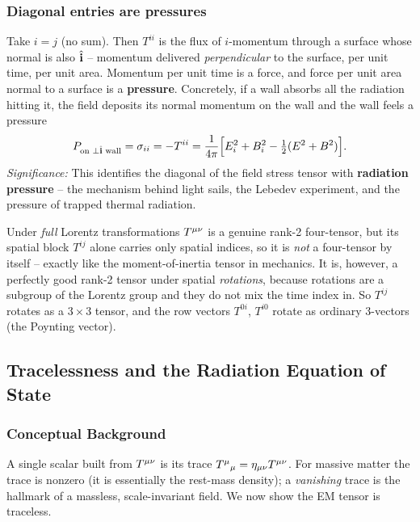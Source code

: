 \subsubsection*{Diagonal entries are pressures}
Take $i=j$ (no sum). Then $T^{ii}$ is the flux of $i$-momentum through a surface whose
normal is also $\hat{\mathbf{i}}$ -- momentum delivered \emph{perpendicular} to the surface, per unit
time, per unit area. Momentum per unit time is a force, and force per unit area normal to a
surface is a \textbf{pressure}. Concretely, if a wall absorbs all the radiation hitting it,
the field deposits its normal momentum on the wall and the wall feels a pressure
\begin{equation}\label{eq:lec24:pressure}
  P_{\text{on }\perp\hat{\mathbf{i}}\text{ wall}}=\sigma_{ii}=-T^{ii}=
  \frac{1}{4\pi}\Big[E_i^2+B_i^2-\tfrac12(E^2+B^2)\Big].
\end{equation}
\textit{Significance:} This identifies the diagonal of the field stress tensor with
\textbf{radiation pressure} -- the mechanism behind light sails, the Lebedev experiment, and
the pressure of trapped thermal radiation.

\begin{remark}
Under \emph{full} Lorentz transformations $T^{\mu\nu}$ is a genuine rank-2 four-tensor, but
its spatial block $T^{ij}$ alone carries only spatial indices, so it is \emph{not} a
four-tensor by itself -- exactly like the moment-of-inertia tensor in mechanics. It is,
however, a perfectly good rank-2 tensor under spatial \emph{rotations}, because rotations are
a subgroup of the Lorentz group and they do not mix the time index in. So $T^{ij}$ rotates
as a $3\times3$ tensor, and the row vectors $T^{0i}$, $T^{i0}$ rotate as ordinary 3-vectors
(the Poynting vector).
\end{remark}

\subsection{Tracelessness and the Radiation Equation of State}
\label{subsec:lec24:trace}

\subsubsection*{Conceptual Background}
A single scalar built from $T^{\mu\nu}$ is its trace $T^{\mu}{}_{\mu}=\eta_{\mu\nu}T^{\mu\nu}$.
For massive matter the trace is nonzero (it is essentially the rest-mass density); a
\emph{vanishing} trace is the hallmark of a massless, scale-invariant field. We now show the
EM tensor is traceless.

